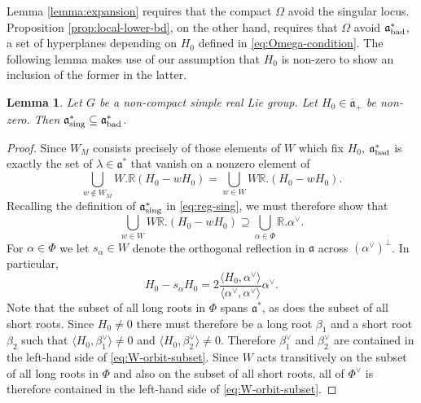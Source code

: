 \documentclass[12pt]{amsart}
\newtheorem{lemma}[theorem]{Lemma}
\theoremstyle{remark}
\newcommand{\R}{\mathbb R}
\newcommand{\ga}{\mathfrak a}
\begin{document}
Lemma \ref{lemma:expansion} requires that the compact $\Omega$ avoid the singular locus. Proposition \ref{prop:local-lower-bd}, on the other hand, requires that $\Omega$ avoid $\ga^*_{\rm bad}$, a set of hyperplanes depending on $H_0$ defined in \eqref{eq:Omega-condition}. The following lemma makes use of our assumption that $H_0$ is non-zero to show an inclusion of the former in the latter.

\begin{lemma}\label{lemma:max-Levi}
Let $G$ be a non-compact simple real Lie group. Let $H_0\in\overline{\ga}_+$ be non-zero. Then $\ga^*_{\textnormal{sing}} \subseteq \ga^*_{\textnormal{bad}}$.
\end{lemma}


\begin{proof}
Since $W_M$ consists precisely of those elements of $W$ which fix $H_0$, $\ga^*_{\textnormal{bad}}$ is exactly the set of $\lambda \in \ga^*$ that vanish on a nonzero element of 
\begin{equation}\label{lines:3}
\bigcup_{w\notin W_M} W.\R(H_0- wH_0)=\bigcup_{w\in W} W\R.(H_0 - wH_0).
\end{equation}
Recalling the definition of $\ga^*_{\textnormal{sing}}$ in \eqref{eq:reg-sing}, we must therefore show that
\begin{equation}\label{eq:W-orbit-subset}
\bigcup_{w\in W} W\R.(H_0 - wH_0) \supseteq \bigcup_{\alpha\in\Phi}\R.\alpha^\vee.
\end{equation}
For $\alpha\in \Phi$ we let $s_\alpha\in W$ denote the orthogonal reflection in $\ga$ across $(\alpha^\vee)^\perp$. In particular,
\begin{equation}\label{eq:diff:weights}
H_0- s_\alpha H_0
 = 2\frac{\langle H_0,\alpha^\vee \rangle}{\langle\alpha^\vee,\alpha^\vee\rangle}\alpha^\vee.
\end{equation}
Note that the subset of all long roots in $\Phi$ spans $\ga^*$, as does the subset of all short roots. Since $H_0\neq 0$ there must therefore be a long root $\beta_1$ and a short root $\beta_2$ such that $\langle H_0,\beta_1^\vee \rangle\neq0$ and $\langle H_0,\beta_2^\vee \rangle \neq 0$. Therefore $\beta_1^\vee$ and $\beta_2^\vee$ are  contained in the left-hand side of \eqref{eq:W-orbit-subset}. Since $W$ acts transitively on the subset of all long roots in $\Phi$ and also on the subset of all short roots, all of $\Phi^\vee$ is therefore contained in the left-hand side of \eqref{eq:W-orbit-subset}.
\end{proof}
\end{document}
